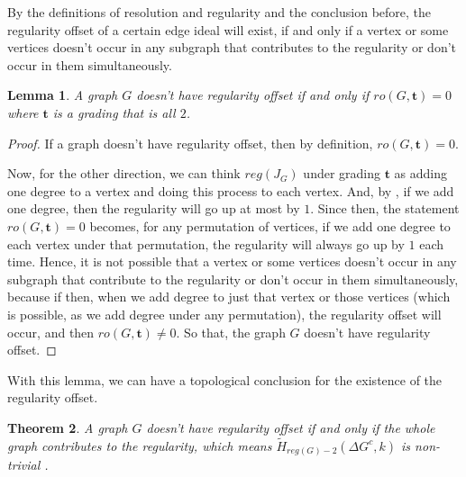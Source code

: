 \documentclass[dvipsnames,10pt]{article}
\newtheorem{theorem}{Theorem}[section]
\newtheorem{lemma}[theorem]{Lemma}
\begin{document}
By the definitions of resolution and regularity and the conclusion before, the regularity offset of a certain edge ideal will exist, if and only if a vertex or some vertices doesn't occur in any subgraph that contributes to the regularity or don't occur in them simultaneously. 

\begin{lemma}
    A graph $G$ doesn't have regularity offset if and only if $ro(G,\mathbf{t})=0$ where $\mathbf{t}$ is a grading that is all $2$.
\end{lemma}

\begin{proof}
    If a graph doesn't have regularity offset, then by definition, $ro(G,\mathbf{t})=0$.

    Now, for the other direction, we can think $reg(J_G)$ under grading $\mathbf{t}$ as adding one degree to a vertex and doing this process to each vertex. And, by , if we add one degree, then the regularity will go up at most by $1$. Since then, the statement $ro(G,\mathbf{t})=0$ becomes, for any permutation of vertices, if we add one degree to each vertex under that permutation, the regularity will always go up by $1$ each time. Hence, it is not possible that a vertex or some vertices doesn't occur in any subgraph that contribute to the regularity or don't occur in them simultaneously, because if then, when we add degree to just that vertex or those vertices (which is possible, as we add degree under any permutation), the regularity offset will occur, and then $ro(G,\mathbf{t})\neq0$. So that, the graph $G$ doesn't have regularity offset. 
\end{proof}

With this lemma, we can have a topological conclusion for the existence of the regularity offset.

\begin{theorem}
    A graph $G$ doesn't have regularity offset if and only if the whole graph contributes to the regularity, which means $\widetilde{H}_{reg(G)-2}\left(\Delta G^c, k\right)$ is non-trivial .
\end{theorem}
\end{document}
